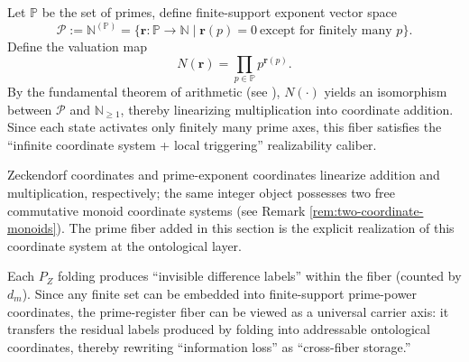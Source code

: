 \begin{definition}\label{def:pom-prime-fiber}
Let $\mathbb{P}$ be the set of primes, define finite-support exponent vector space
\[
\mathcal{P}:=\mathbb{N}^{(\mathbb{P})}=\{\mathbf{r}:\mathbb{P}\to\mathbb{N}\mid \mathbf{r}(p)=0\ \text{except for finitely many }p\}.
\]
Define the valuation map
\[
N(\mathbf{r})=\prod_{p\in\mathbb{P}} p^{\mathbf{r}(p)}.
\]
By the fundamental theorem of arithmetic (see \cite{Apostol1976}), $N(\cdot)$ yields an isomorphism between $\mathcal{P}$ and $\mathbb{N}_{\ge 1}$, thereby linearizing multiplication into coordinate addition. Since each state activates only finitely many prime axes, this fiber satisfies the ``infinite coordinate system + local triggering'' realizability caliber.
\end{definition}

\begin{remark}\label{rem:pom-two-monoids}
Zeckendorf coordinates and prime-exponent coordinates linearize addition and multiplication, respectively; the same integer object possesses two free commutative monoid coordinate systems (see Remark \ref{rem:two-coordinate-monoids}). The prime fiber added in this section is the explicit realization of this coordinate system at the ontological layer.
\end{remark}

\begin{remark}\label{rem:pom-prime-carry}
Each $P_Z$ folding produces ``invisible difference labels'' within the fiber (counted by $d_m$). Since any finite set can be embedded into finite-support prime-power coordinates, the prime-register fiber can be viewed as a universal carrier axis: it transfers the residual labels produced by folding into addressable ontological coordinates, thereby rewriting ``information loss'' as ``cross-fiber storage.''
\end{remark}

